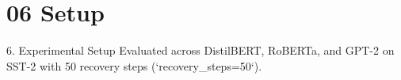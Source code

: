 \section{06 Setup}

 6. Experimental Setup
Evaluated across DistilBERT, RoBERTa, and GPT-2 on SST-2 with 50 recovery steps (`recovery\_steps=50`).
